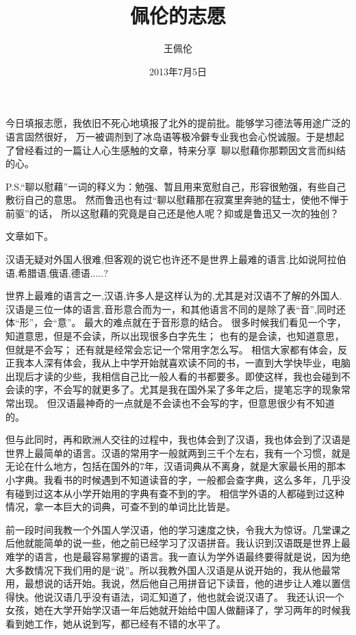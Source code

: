 \documentclass{ctexart}
\title{佩伦的志愿}
\author{王佩伦}
\date{2013年7月5日}
\begin{document}
\maketitle

今日填报志愿，我依旧不死心地填报了北外的提前批。能够学习德法等用途广泛的语言固然很好，
万一被调剂到了冰岛语等极冷僻专业我也会心悦诚服。于是想起了曾经看过的一篇让人心生感触的文章，特来分享~聊以慰藉你那颗因文言而纠结的心。

P.S.“聊以慰藉”一词的释义为：勉强、暂且用来宽慰自己，形容很勉强，有些自己敷衍自己的意思。
然而鲁迅也有过“聊以慰藉那在寂寞里奔驰的猛士，使他不惮于前驱”的话，
所以这慰藉的究竟是自己还是他人呢？抑或是鲁迅又一次的独创？

文章如下。

汉语无疑对外国人很难,但客观的说它也许还不是世界上最难的语言.比如说阿拉伯语,希腊语,俄语,德语.....?

世界上最难的语言之一,汉语,许多人是这样认为的,尤其是对汉语不了解的外国人.
汉语是三位一体的语言,音形意合而为一，和其他语言不同的是除了表“音”,同时还体“形”，会“意”。
最大的难点就在于音形意的结合。
很多时候我们看见一个字，知道意思，但是不会读，所以出现很多白字先生；
也有的是会读，也知道意思，但就是不会写；
还有就是经常会忘记一个常用字怎么写。
相信大家都有体会，反正我本人深有体会，我从上中学开始就喜欢读不同的书，一直到大学快毕业，电脑出现后才读的少些，我相信自己比一般人看的书都要多。即使这样，我也会碰到不会读的字，不会写的就更多了。尤其是我在国外呆了多年之后，提笔忘字的现象常常出现。
但汉语最神奇的一点就是不会读也不会写的字，但意思很少有不知道的。

但与此同时，再和欧洲人交往的过程中，我也体会到了汉语，我也体会到了汉语是世界上最简单的语言。汉语的常用字一般就两到三千个左右，我有一个习惯，就是无论在什么地方，包括在国外的7年，汉语词典从不离身，就是大家最长用的那本小字典。我看书的时候遇到不知道读音的字，一般都会查字典，这么多年，几乎没有碰到过这本从小学开始用的字典有查不到的字。
相信学外语的人都碰到过这种情况，拿一本巨大的词典，可查不到的单词比比皆是。

前一段时间我教一个外国人学汉语，他的学习速度之快，令我大为惊讶。几堂课之后他就能简单的说一些，他之前已经学习了汉语拼音。我认识到汉语既是世界上最难学的语言，也是最容易掌握的语言。我一直认为学外语最终要得就是说，因为绝大多数情况下我们用的是“说”。所以我教外国人汉语是从说开始的，我从他最常用，最想说的话开始。我说，然后他自己用拼音记下读音，他的进步让人难以置信得快。他说汉语几乎没有语法，词汇知道了，他也就会说汉语了。
我还认识一个女孩，她在大学开始学汉语一年后她就开始给中国人做翻译了，学习两年的时候我看到她工作，她从说到写，都已经有不错的水平了。
\end{document}
